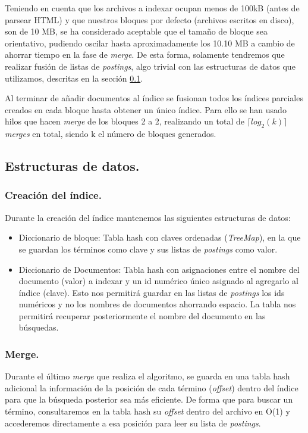 \documentclass[spanish]{assignment}
\begin{document}
	Teniendo en cuenta que los archivos a indexar ocupan menos de 100kB (antes de parsear HTML) y que nuestros bloques por defecto (archivos escritos en disco), son de 10 MB, se ha considerado aceptable que el tamaño de bloque sea orientativo, pudiendo oscilar hasta aproximadamente los 10.10 MB a cambio de ahorrar tiempo en la fase de \textit{merge}. De esta forma, solamente tendremos que realizar fusión de listas de \textit{postings}, algo trivial con las estructuras de datos que utilizamos, descritas en la sección \ref{est_datos}.
	
	Al terminar de añadir documentos al índice se fusionan todos los índices parciales creados en cada bloque hasta obtener un único índice. Para ello se han usado hilos que hacen \textit{merge} de los bloques 2 a 2, realizando un total de $\lceil log_2(k) \rceil$ \textit{merges} en total, siendo k el número de bloques generados.
	
	\subsection{Estructuras de datos.}\label{est_datos}
	\subsubsection{Creación del índice.}
	Durante la creación del índice mantenemos las siguientes estructuras de datos:
	\begin{itemize}
		\item Diccionario de bloque: Tabla hash con claves ordenadas (\textit{TreeMap}), en la que se guardan los términos como clave y sus listas de \textit{postings} como valor.
		\item Diccionario de Documentos: Tabla hash con asignaciones entre el nombre del documento (valor) a indexar y un id numérico único asignado al agregarlo al índice (clave). Esto nos permitirá guardar en las listas de \textit{postings} los ids numéricos y no los nombres de documentos ahorrando espacio. La tabla nos permitirá recuperar posteriormente el nombre del documento en las búsquedas.
	\end{itemize}
	\subsubsection{Merge.}
	Durante el último \textit{merge} que realiza el algoritmo, se guarda en una tabla hash adicional la información de la posición de cada término (\textit{offset}) dentro del índice para que la búsqueda posterior sea más eficiente. 
	De forma que para buscar un término, consultaremos en la tabla hash su \textit{offset} dentro del archivo en O(1) y accederemos directamente a esa posición para leer su lista de \textit{postings}.\\
	
\end{document}
